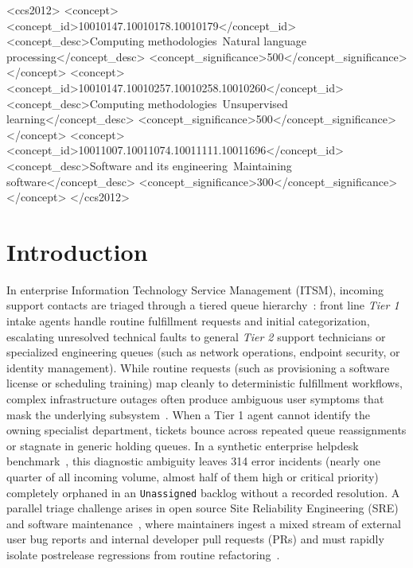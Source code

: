 \documentclass[sigconf,nonacm,pbalance]{acmart}
\begin{document}
\begin{CCSXML}
<ccs2012>
 <concept>
  <concept_id>10010147.10010178.10010179</concept_id>
  <concept_desc>Computing methodologies~Natural language processing</concept_desc>
  <concept_significance>500</concept_significance>
 </concept>
 <concept>
  <concept_id>10010147.10010257.10010258.10010260</concept_id>
  <concept_desc>Computing methodologies~Unsupervised learning</concept_desc>
  <concept_significance>500</concept_significance>
 </concept>
 <concept>
  <concept_id>10011007.10011074.10011111.10011696</concept_id>
  <concept_desc>Software and its engineering~Maintaining software</concept_desc>
  <concept_significance>300</concept_significance>
 </concept>
</ccs2012>
\end{CCSXML}



\maketitle

\section{Introduction}
In enterprise Information Technology Service Management (ITSM), incoming support contacts are triaged through a tiered queue hierarchy~\cite{agarwal2012identifying, vogel2024itsm}: front line \emph{Tier 1} intake agents handle routine fulfillment requests and initial categorization, escalating unresolved technical faults to general \emph{Tier 2} support technicians or specialized engineering queues (such as network operations, endpoint security, or identity management). While routine requests (such as provisioning a software license or scheduling training) map cleanly to deterministic fulfillment workflows, complex infrastructure outages often produce ambiguous user symptoms that mask the underlying subsystem~\cite{chen2020incidental}. When a Tier 1 agent cannot identify the owning specialist department, tickets bounce across repeated queue reassignments or stagnate in generic holding queues. In a synthetic enterprise helpdesk benchmark~\cite{vogel2024itsm}, this diagnostic ambiguity leaves 314 error incidents (nearly one quarter of all incoming volume, almost half of them high or critical priority) completely orphaned in an \texttt{Unassigned} backlog without a recorded resolution. A parallel triage challenge arises in open source Site Reliability Engineering (SRE) and software maintenance~\cite{lhoest2021datasets, he2017drain}, where maintainers ingest a mixed stream of external user bug reports and internal developer pull requests (PRs) and must rapidly isolate postrelease regressions from routine refactoring~\cite{chen2020incidental}.
\end{document}
